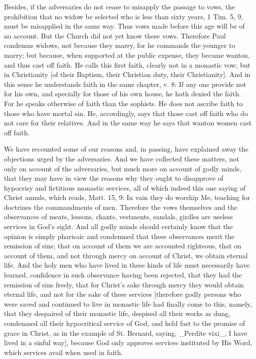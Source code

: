 Besides, if the adversaries do not cease to misapply the passage to
vows, the prohibition that no widow be selected who is less than
sixty years, 1 Tim. 5, 9, must be misapplied in the same way.  Thus
vows made before this age will be of no account.  But the Church did
not yet know these vows. Therefore Paul condemns widows, not because
they marry, for he commands the younger to marry; but because, when
supported at the public expense, they became wanton, and thus cast
off faith. He calls this first faith, clearly not in a monastic vow,
but in Christianity [of their Baptism, their Christian duty, their
Christianity]. And in this sense he understands faith in the same
chapter, v. 8: If any one provide not for his own, and specially for
those of his own house, he hath denied the faith. For he speaks
otherwise of faith than the sophists. He does not ascribe faith to
those who have mortal sin. He, accordingly, says that those cast off
faith who do not care for their relatives. And in the same way he
says that wanton women cast off faith.

We have recounted some of our reasons and, in passing, have explained
away the objections urged by the adversaries.  And we have collected
these matters, not only on account of the adversaries, but much more
on account of godly minds, that they may have in view the reasons why
they ought to disapprove of hypocrisy and fictitious monastic
services, all of which indeed this one saying of Christ annuls, which
reads, Matt. 15, 9: In vain they do worship Me, teaching for
doctrines the commandments of men.  Therefore the vows themselves and
the observances of meats, lessons, chants, vestments, sandals,
girdles are useless services in God's sight.  And all godly minds
should certainly know that the opinion is simply pharisaic and
condemned that these observances merit the remission of sins; that on
account of them we are accounted righteous, that on account of them,
and not through mercy on account of Christ, we obtain eternal life.
And the holy men who have lived in these kinds of life must
necessarily have learned, confidence in such observance having been
rejected, that they had the remission of sins freely, that for
Christ's sake through mercy they would obtain eternal life, and not
for the sake of these services [therefore godly persons who were
saved and continued to live in monastic life had finally come to this,
namely, that they despaired of their monastic life, despised all
their works as dung, condemned all their hypocritical service of God,
and held fast to the promise of grace in Christ, as in the example of
St. Bernard, saying, _Perdite vixi_, I have lived in a sinful way],
because God only approves services instituted by His Word, which
services avail when used in faith.




